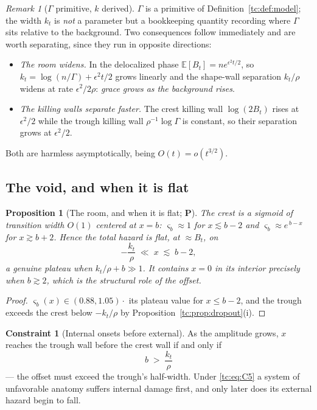 \documentclass[11pt]{article}
\numberwithin{equation}{section}
\theoremstyle{plain}
\newtheorem{proposition}[theorem]{Proposition}
\theoremstyle{definition}
\newtheorem{constraint}{Constraint}
\theoremstyle{remark}
\newtheorem{remark}[theorem]{Remark}
\newcommand{\E}{\mathbb{E}}
\begin{document}
\begin{remark}[$\Gamma$ primitive, $k$ derived]\label{tc:rem:kderived}
$\Gamma$ is a primitive of Definition~\ref{tc:def:model}; the width
$k_t$ is \emph{not} a parameter but a bookkeeping quantity recording
where $\Gamma$ sits relative to the background. Two consequences follow
immediately and are worth separating, since they run in opposite
directions:
\begin{itemize}[itemsep=1pt]
\item \emph{The room widens.} In the delocalized phase
$\E[B_t]=ne^{\epsilon^{2}t/2}$, so $k_t=\log(n/\Gamma)+\epsilon^{2}t/2$
grows linearly and the shape-wall separation $k_t/\rho$ widens at rate
$\epsilon^{2}/2\rho$: \emph{grace grows as the background rises}.
\item \emph{The killing walls separate faster.} The crest killing wall
$\log(2B_t)$ rises at $\epsilon^{2}/2$ while the trough killing wall
$\rho^{-1}\log\Gamma$ is constant, so their separation grows at
$\epsilon^{2}/2$.
\end{itemize}
Both are harmless asymptotically, being $O(t)=o(t^{3/2})$.
\end{remark}

\subsection{The void, and when it is flat}\label{tc:subsub:void}

\begin{proposition}[The room, and when it is flat; \textbf{P}]
\label{tc:prop:flat}
The crest is a sigmoid of transition width $O(1)$ centered at $x=b$:
$\varsigma_b\approx1$ for $x\lesssim b-2$ and $\varsigma_b\approx
e^{\,b-x}$ for $x\gtrsim b+2$. Hence the total hazard is flat, at
$\approx B_t$, on
\begin{equation}\label{tc:eq:flat}
-\frac{k_t}{\rho}\;\ll\;x\;\lesssim\;b-2 ,
\end{equation}
a genuine plateau when $k_t/\rho+b\gg1$. It contains $x=0$ in its
interior precisely when $b\gtrsim2$, which is the structural role of the
offset.
\end{proposition}

\begin{proof}
$\varsigma_b(x)\in(0.88,1.05)\cdot$ its plateau value for
$x\le b-2$, and the trough exceeds the crest below $-k_t/\rho$ by
Proposition~\ref{tc:prop:dropout}(i).
\end{proof}

\begin{constraint}[Internal onsets before external]\label{tc:C5}
As the amplitude grows, $x$ reaches the trough wall before the crest
wall if and only if
\begin{equation}\label{tc:eq:C5}
\boxed{\;b\;>\;\frac{k_t}{\rho}\;}
\end{equation}
--- the offset must exceed the trough's half-width. Under
\eqref{tc:eq:C5} a system of unfavorable anatomy suffers internal
damage first, and only later does its external hazard begin to fall.
\end{constraint}
\end{document}
